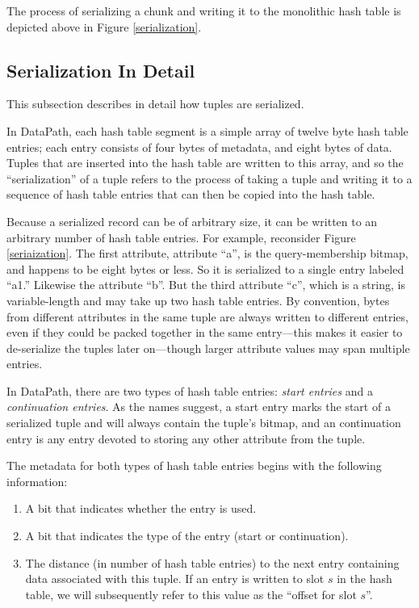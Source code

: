 \documentclass{sig-alternate}
\renewcommand\:{\colon} %
\begin{document}
The process of serializing a chunk and writing it to the monolithic hash table is depicted above in Figure \ref{serialization}.

\subsection{Serialization In Detail}

This subsection describes in detail how tuples are serialized.

In DataPath, each hash table segment is a simple array of twelve byte
hash table entries; each entry consists of four bytes of metadata, and eight bytes of
data.  Tuples that are inserted into the hash table are written to this array, and so 
the ``serialization'' of a tuple
refers to the process of taking a tuple and writing it to a sequence of hash table entries that can then be copied
into the hash table.

Because a serialized record can be of arbitrary size, it can be written to an arbitrary number of hash table entries.  
For example, reconsider Figure \ref{seriaization}. The first attribute, attribute ``a'', is the query-membership
bitmap, and happens to be eight bytes
or less.  So it is serialized to a single entry labeled ``a1.''  Likewise the attribute ``b''.  But the third attribute ``c'', which
is a string, is variable-length and may take up two hash table entries.  By 
convention, bytes from different attributes in the same tuple are always written to different entries, even if 
they could be packed together in the same entry---this makes it easier to de-serialize the tuples later on---though 
larger attribute values may span multiple entries.

In
DataPath, there are two types of hash table entries: \emph{start entries} and a \emph{continuation entries}.  As the names suggest, a
start entry marks the start of a serialized tuple and will always contain the tuple's bitmap,
and an continuation entry is any entry devoted to storing any other attribute from the tuple.

The metadata for both types of hash table entries begins with the following information:

\begin{enumerate}

\item A bit that indicates whether the entry is used.

\item A bit that indicates the type of the entry (start or continuation).

\item The distance (in number of hash table entries) to the next entry containing data associated with this tuple.
If an entry is written to slot $s$ in the hash table,
we will subsequently refer to this value as the ``offset for slot $s$''.

\end{enumerate}
\end{document}
